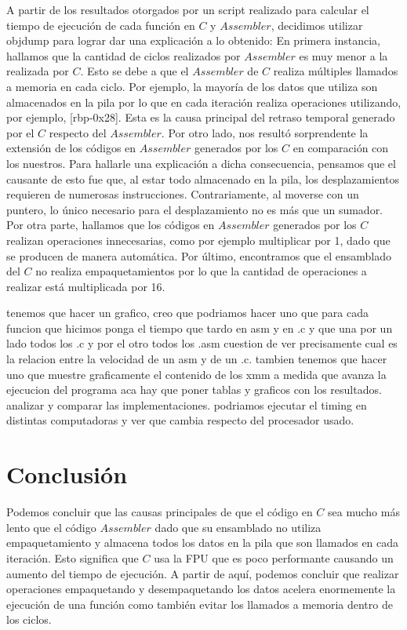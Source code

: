 \documentclass[10pt, a4paper]{article}
\begin{document}
A partir de los resultados otorgados por un script realizado para calcular el tiempo de ejecución de cada función en $C$ y $Assembler$, decidimos utilizar objdump para lograr dar una explicación a lo obtenido:\newline
En primera instancia, hallamos que la cantidad de ciclos realizados por $Assembler$ es muy menor a la realizada por $C$. Esto se debe a que el $Assembler$ de $C$ realiza múltiples llamados a memoria en cada ciclo. Por ejemplo, la mayoría de los datos que utiliza son almacenados en la pila por lo que en cada iteración realiza operaciones utilizando, por ejemplo, [rbp-0x28]. Esta es la causa principal del retraso temporal generado por el $C$ respecto del $Assembler$. \newline 
Por otro lado, nos resultó sorprendente la extensión de los códigos en $Assembler$ generados por los $C$ en comparación con los nuestros. Para hallarle una explicación a dicha consecuencia, pensamos que el causante de esto fue que, al estar todo almacenado en la pila, los desplazamientos requieren de numerosas instrucciones. Contrariamente, al moverse con un puntero, lo único necesario para el desplazamiento no es más que un sumador. \newline
Por otra parte, hallamos que los códigos en $Assembler$ generados por los $C$ realizan operaciones innecesarias, como por ejemplo multiplicar por 1, dado que se producen de manera automática.\newline
Por último, encontramos que el ensamblado del $C$ no realiza empaquetamientos por lo que la cantidad de operaciones a realizar está multiplicada por 16.\newline

tenemos que hacer un grafico, creo que podriamos hacer uno que para cada funcion que hicimos ponga el tiempo que tardo en asm y en .c y que una por un lado todos los .c y por el otro todos los .asm cuestion de ver precisamente cual es la relacion entre la velocidad de un asm y de un .c. tambien tenemos que hacer uno que muestre graficamente el contenido de los xmm a medida que avanza la ejecucion del programa\newline
aca hay que poner tablas y graficos con los resultados. analizar y comparar las implementaciones. podriamos ejecutar el timing en distintas computadoras y ver que cambia respecto del procesador usado.
\section{Conclusi\'on}
Podemos concluir que las causas principales de que el código en $C$ sea mucho más lento que el código $Assembler$ dado que su ensamblado no utiliza empaquetamiento y almacena todos los datos en la pila que son llamados en cada iteración. Esto significa que $C$ usa la FPU que es poco performante causando un aumento del tiempo de ejecución.\newline
A partir de aquí, podemos concluir que realizar operaciones empaquetando y desempaquetando los datos acelera enormemente la ejecución de una función como también evitar los llamados a memoria dentro de los ciclos.
\end{document}
